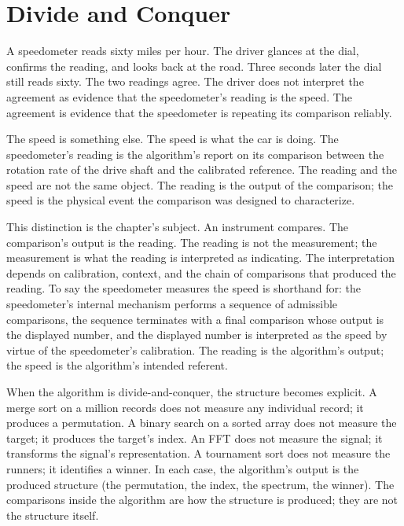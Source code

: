 \chapter{Divide and Conquer}
\label{chap:divide-and-conquer}


\begin{chapteressay}

A speedometer reads sixty miles per hour. The driver glances at the
dial, confirms the reading, and looks back at the road. Three seconds
later the dial still reads sixty. The two readings agree. The driver
does not interpret the agreement as evidence that the speedometer's
reading is the speed. The agreement is evidence that the speedometer
is repeating its comparison reliably.

The speed is something else. The speed is what the car is doing. The
speedometer's reading is the algorithm's report on its comparison
between the rotation rate of the drive shaft and the calibrated
reference. The reading and the speed are not the same object. The
reading is the output of the comparison; the speed is the physical
event the comparison was designed to characterize.

This distinction is the chapter's subject. An instrument compares.
The comparison's output is the reading. The reading is not the
measurement; the measurement is what the reading is interpreted as
indicating. The interpretation depends on calibration, context, and
the chain of comparisons that produced the reading. To say the
speedometer measures the speed is shorthand for: the speedometer's
internal mechanism performs a sequence of admissible comparisons, the
sequence terminates with a final comparison whose output is the
displayed number, and the displayed number is interpreted as the
speed by virtue of the speedometer's calibration. The reading is the
algorithm's output; the speed is the algorithm's intended referent.

When the algorithm is divide-and-conquer, the structure becomes
explicit. A merge sort on a million records does not measure any
individual record; it produces a permutation. A binary search on a
sorted array does not measure the target; it produces the target's
index. An FFT does not measure the signal; it transforms the
signal's representation. A tournament sort does not measure the
runners; it identifies a winner. In each case, the algorithm's
output is the produced structure (the permutation, the index, the
spectrum, the winner). The comparisons inside the algorithm are how
the structure is produced; they are not the structure itself.


\end{chapteressay}
